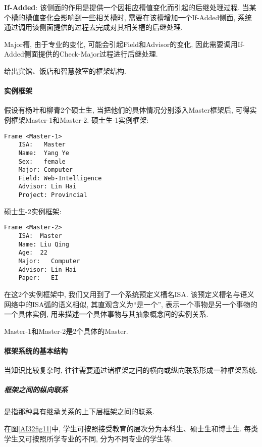 \textbf{If-Added}: 该侧面的作用是提供一个因相应槽值变化而引起的后继处理过程. 当某个槽的槽值变化会影响到一些相关槽时, 需要在该槽增加一个If-Added侧面, 系统通过调用该侧面提供的过程去完成对其相关槽的后继处理.
\begin{example}
  Major槽, 由于专业的变化, 可能会引起Field和Advisor的变化, 因此需要调用If-Added侧面提供的Check-Major过程进行后继处理.
\end{example}
\begin{example}
    给出宾馆、饭店和智慧教室的框架结构.
\end{example}
\paragraph{实例框架}
\begin{example}
    假设有杨叶和柳青2个硕士生, 当把他们的具体情况分别添入Master框架后, 可得实例框架Master-1和Master-2.
    硕士生-1实例框架:
\begin{Verbatim}
Frame <Master-1>
    ISA:   Master
    Name:  Yang Ye
    Sex:   female
    Major: Computer
    Field: Web-Intelligence
    Advisor: Lin Hai
    Project: Provincial
\end{Verbatim}

硕士生-2实例框架:
\begin{Verbatim}
Frame <Master-2>
    ISA:  Master
    Name: Liu Qing
    Age:  22
    Major:   Computer
    Advisor: Lin Hai
    Paper:   EI
\end{Verbatim}
\end{example}

    在这2个实例框架中, 我们又用到了一个系统预定义槽名ISA. 该预定义槽名与语义网络中的ISA弧的语义相似, 其直观含义为“是一个”, 表示一个事物是另一个事物的一个具体实例, 用来描述一个具体事物与其抽象概念间的实例关系.
    
\begin{remark}
    Master-1和Master-2是2个具体的Master.
\end{remark}
\paragraph{框架系统的基本结构}
    当知识比较复杂时, 往往需要通过诸框架之间的横向或纵向联系形成一种框架系统.
\subparagraph{框架之间的纵向联系}
是指那种具有继承关系的上下层框架之间的联系.
\begin{example}
    在图\ref{AI32fig11}中, 学生可按照接受教育的层次分为本科生、硕士生和博士生. 每类学生又可按照所学专业的不同, 分为不同专业的学生等.
\end{example}

